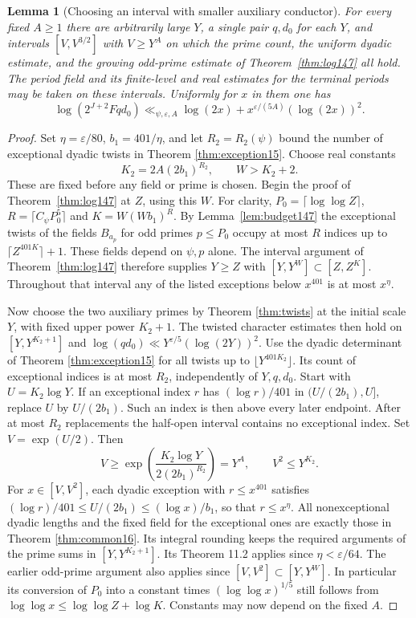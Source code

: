 \documentclass[a4paper,11pt]{article}
\newtheorem{lemma}[proposition]{Lemma}
\theoremstyle{definition}
\theoremstyle{remark}
\numberwithin{equation}{section}
\begin{document}
\begin{lemma}[Choosing an interval with smaller auxiliary conductor]
\label{lem:delay197}
For every fixed \(A\ge1\) there are arbitrarily large \(Y\), a
single pair \(q,d_0\) for each \(Y\), and intervals
\([V,V^{3/2}]\) with \(V\ge Y^A\) on which the prime count,
the uniform dyadic estimate, and the growing odd-prime estimate
of Theorem~\ref{thm:log147} all hold. The period field and its
finite-level and real estimates for the terminal periods may be taken
on these intervals. Uniformly for \(x\) in them one has
\begin{equation}
 \log(2^{J+2}F qd_0)
     \ll_{\psi,\varepsilon,A}
        \log(2x)+x^{\varepsilon/(5A)}(\log(2x))^2.
 \label{eq:delay197}
\end{equation}
\end{lemma}
\begin{proof}
Set \(\eta=\varepsilon/80\), \(b_1=401/\eta\), and let
\(R_2=R_2(\psi)\) bound the number of exceptional dyadic twists
in Theorem \ref{thm:exception15}. Choose real constants
\[
       K_2=2A(2b_1)^{R_2},\qquad W>K_2+2 .
\]
These are fixed before any field or prime is chosen. Begin the
proof of Theorem~\ref{thm:log147} at \(Z\), using this \(W\).
For clarity, \(P_0=\lceil\log\log Z\rceil\),
\(R=\lceil C_\psi P_0^5\rceil\) and \(K=W(Wb_1)^R\). By
Lemma~\ref{lem:budget147} the exceptional twists of the fields
\(B_{a_p}\) for odd primes \(p\le P_0\) occupy at most \(R\)
indices up to \(\lceil Z^{401K}\rceil+1\). These fields depend
on \(\psi,p\) alone. The interval argument of Theorem~\ref{thm:log147}
therefore supplies \(Y\ge Z\) with \([Y,Y^W]\subset[Z,Z^K]\).
Throughout that interval any of the listed exceptions below
\(x^{401}\) is at most \(x^\eta\).

Now choose the two auxiliary primes by Theorem \ref{thm:twists}
at the initial scale \(Y\), with fixed upper power \(K_2+1\).
The twisted character estimates then hold on \([Y,Y^{K_2+1}]\)
and \(\log(qd_0)\ll Y^{\varepsilon/5}(\log(2Y))^2\).
Use the dyadic determinant of Theorem \ref{thm:exception15} for all
twists up to \(\lfloor Y^{401K_2}\rfloor\). Its count of
exceptional indices is at most \(R_2\), independently of
\(Y,q,d_0\). Start with \(U=K_2\log Y\). If an exceptional
index \(r\) has \((\log r)/401\) in \((U/(2b_1),U]\), replace
\(U\) by \(U/(2b_1)\). Such an index is then above every
later endpoint. After at most \(R_2\) replacements the
half-open interval contains no exceptional index. Set
\(V=\exp(U/2)\). Then
\[
 V\ge\exp\!\left(\frac{K_2\log Y}{2(2b_1)^{R_2}}\right)=Y^A,
 \qquad V^2\le Y^{K_2}.
\]
For \(x\in[V,V^2]\), each dyadic exception with \(r\le x^{401}\)
satisfies \((\log r)/401\le U/(2b_1)\le(\log x)/b_1\), so that
\(r\le x^\eta\). All nonexceptional dyadic lengths and the fixed
field for the exceptional ones are exactly those in Theorem \ref{thm:common16}. Its integral rounding keeps the required
arguments of the prime sums in \([Y,Y^{K_2+1}]\). Its Theorem
11.2 applies since \(\eta<\varepsilon/64\). The earlier
odd-prime argument also applies since \([V,V^2]\subset[Y,Y^W]\).
In particular its conversion of \(P_0\) into a constant times
\((\log\log x)^{1/5}\) still follows from
\(\log\log x\le\log\log Z+\log K\). Constants may now depend
on the fixed \(A\).


\end{proof}
\end{document}
